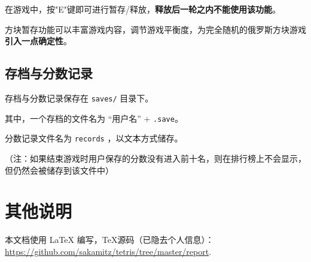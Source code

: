 \documentclass{style/ucasproposal}
\newcommand{\cinline}[1]{\texttt{#1}}
\begin{document}
在游戏中，按"E"键即可进行暂存/释放，\textbf{释放后一轮之内不能使用该功能}。

方块暂存功能可以丰富游戏内容，调节游戏平衡度，为完全随机的俄罗斯方块游戏\textbf{引入一点确定性}。


\subsection{存档与分数记录}
存档与分数记录保存在 \cinline{saves/} 目录下。

其中，一个存档的文件名为 “用户名” + \cinline{.save}。

分数记录文件名为 \cinline{records} ，以文本方式储存。

（注：如果结束游戏时用户保存的分数没有进入前十名，则在排行榜上不会显示，
但仍然会被储存到该文件中）

\section*{其他说明}

本文档使用 \LaTeX{} 编写，TeX源码（已隐去个人信息）： \url{https://github.com/sakamitz/tetris/tree/master/report}.
\end{document}
